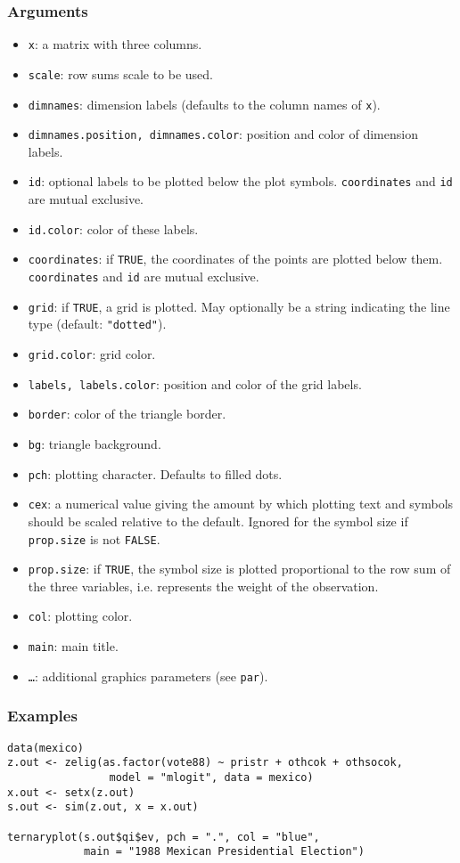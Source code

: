 \subsubsection{Arguments}
\begin{itemize}
\item {\tt x}: a matrix with three columns.
\item {\tt  scale}: row sums scale to be used.
\item {\tt dimnames}: dimension labels (defaults to the column names
of {\tt x}).
\item {\tt dimnames.position, dimnames.color}: position and color of dimension labels.
\item {\tt id}: optional labels to be plotted below the plot
symbols. {\tt coordinates} and {\tt id} are mutual exclusive. 
\item {\tt id.color}:  color of these labels.
\item {\tt coordinates}: if {\tt TRUE}, the coordinates of the points are
    plotted below them. {\tt coordinates} and {\tt id} are mutual exclusive.
\item {\tt grid}: if {\tt TRUE}, a grid is plotted. May optionally
    be a string indicating the line type (default: {\tt "dotted"}).
\item {\tt grid.color}: grid color.
\item {\tt labels, labels.color}: position and color of the grid labels.
\item {\tt border}: color of the triangle border.
\item {\tt bg}: triangle background.
\item {\tt pch}: plotting character. Defaults to filled dots.
\item {\tt cex}: a numerical value giving the amount by which plotting text
    and symbols should be scaled relative to the default. Ignored for
    the symbol size if {\tt prop.size} is not {\tt FALSE}.
\item {\tt prop.size}: if {\tt TRUE}, the symbol size is plotted
    proportional to the row sum of the three variables, i.e. represents
    the weight of the observation.
\item {\tt col}: plotting color.
  \item {\tt main}: main title.
\item {\tt \dots}: additional graphics parameters (see {\tt par}).
\end{itemize}

\subsubsection{Examples}
\begin{verbatim}
data(mexico)
z.out <- zelig(as.factor(vote88) ~ pristr + othcok + othsocok, 
                model = "mlogit", data = mexico)
x.out <- setx(z.out)
s.out <- sim(z.out, x = x.out)

ternaryplot(s.out$qi$ev, pch = ".", col = "blue",
            main = "1988 Mexican Presidential Election")
\end{verbatim}

